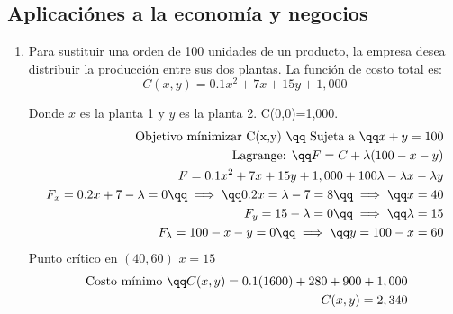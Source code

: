 \subsection{Aplicaciónes a la economía y negocios}
\begin{enumerate}
    \item Para sustituir una orden de 100 unidades de un producto, la empresa desea distribuir la producción entre sus dos plantas. La función de costo total es:
    \[
      C(x,y) = 0.1x^2+7x+15y+1,000
    \]
    \begin{center}
        Donde $\displaystyle x$ es la planta 1 y $\displaystyle y$ es la planta 2. \newline 
         C(0,0)=1,000.
        \begin{align*}
            \text{ Objetivo mínimizar C(x,y) } \qq \text{ Sujeta a } \qq x+y=100 \\ 
            \text{ Lagrange: } \qq F= C+\lambda(100-x-y) \\ 
            F=0.1x^2+7x+15y+1,000+100\lambda-\lambda x-\lambda y \\ 
            F_x = 0.2x+7-\lambda = 0 \qq \implies \qq 0.2x=\lambda - 7 = 8 \qq \implies \qq x = 40 \\ 
            F_y = 15 - \lambda = 0 \qq \implies \qq \lambda=15 \\ 
            F_\lambda = 100-x-y = 0 \qq \implies \qq y = 100-x = 60 \\ 
        \end{align*}
        Punto crítico en $\displaystyle (40,60)$ $\displaystyle x=15$  
        \begin{align*}
          \text{ Costo mínimo }\qq C(x,y) = 0.1(1600) +280 + 900 + 1,000 \\ 
          C(x,y) = 2,340 \\ 
        \end{align*}        
    \end{center}
    

\end{enumerate}
